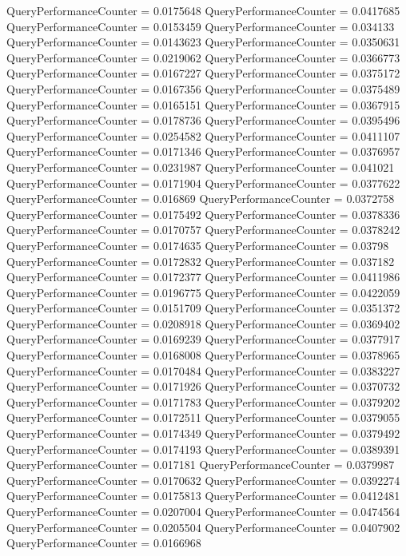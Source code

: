 \documentclass[9pt]{article}
\theoremstyle{plain}
\theoremstyle{definition}
\theoremstyle{remark}
\numberwithin{equation}{section}
\begin{document}
QueryPerformanceCounter  =  0.0175648
QueryPerformanceCounter  =  0.0417685
QueryPerformanceCounter  =  0.0153459
QueryPerformanceCounter  =  0.034133
QueryPerformanceCounter  =  0.0143623
QueryPerformanceCounter  =  0.0350631
QueryPerformanceCounter  =  0.0219062
QueryPerformanceCounter  =  0.0366773
QueryPerformanceCounter  =  0.0167227
QueryPerformanceCounter  =  0.0375172
QueryPerformanceCounter  =  0.0167356
QueryPerformanceCounter  =  0.0375489
QueryPerformanceCounter  =  0.0165151
QueryPerformanceCounter  =  0.0367915
QueryPerformanceCounter  =  0.0178736
QueryPerformanceCounter  =  0.0395496
QueryPerformanceCounter  =  0.0254582
QueryPerformanceCounter  =  0.0411107
QueryPerformanceCounter  =  0.0171346
QueryPerformanceCounter  =  0.0376957
QueryPerformanceCounter  =  0.0231987
QueryPerformanceCounter  =  0.041021
QueryPerformanceCounter  =  0.0171904
QueryPerformanceCounter  =  0.0377622
QueryPerformanceCounter  =  0.016869
QueryPerformanceCounter  =  0.0372758
QueryPerformanceCounter  =  0.0175492
QueryPerformanceCounter  =  0.0378336
QueryPerformanceCounter  =  0.0170757
QueryPerformanceCounter  =  0.0378242
QueryPerformanceCounter  =  0.0174635
QueryPerformanceCounter  =  0.03798
QueryPerformanceCounter  =  0.0172832
QueryPerformanceCounter  =  0.037182
QueryPerformanceCounter  =  0.0172377
QueryPerformanceCounter  =  0.0411986
QueryPerformanceCounter  =  0.0196775
QueryPerformanceCounter  =  0.0422059
QueryPerformanceCounter  =  0.0151709
QueryPerformanceCounter  =  0.0351372
QueryPerformanceCounter  =  0.0208918
QueryPerformanceCounter  =  0.0369402
QueryPerformanceCounter  =  0.0169239
QueryPerformanceCounter  =  0.0377917
QueryPerformanceCounter  =  0.0168008
QueryPerformanceCounter  =  0.0378965
QueryPerformanceCounter  =  0.0170484
QueryPerformanceCounter  =  0.0383227
QueryPerformanceCounter  =  0.0171926
QueryPerformanceCounter  =  0.0370732
QueryPerformanceCounter  =  0.0171783
QueryPerformanceCounter  =  0.0379202
QueryPerformanceCounter  =  0.0172511
QueryPerformanceCounter  =  0.0379055
QueryPerformanceCounter  =  0.0174349
QueryPerformanceCounter  =  0.0379492
QueryPerformanceCounter  =  0.0174193
QueryPerformanceCounter  =  0.0389391
QueryPerformanceCounter  =  0.017181
QueryPerformanceCounter  =  0.0379987
QueryPerformanceCounter  =  0.0170632
QueryPerformanceCounter  =  0.0392274
QueryPerformanceCounter  =  0.0175813
QueryPerformanceCounter  =  0.0412481
QueryPerformanceCounter  =  0.0207004
QueryPerformanceCounter  =  0.0474564
QueryPerformanceCounter  =  0.0205504
QueryPerformanceCounter  =  0.0407902
QueryPerformanceCounter  =  0.0166968
\end{document}
